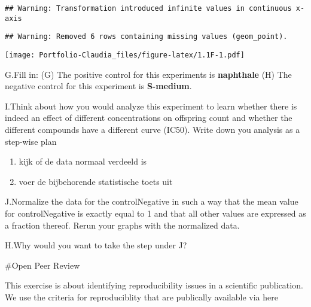 \documentclass[
]{book}
\providecommand{\tightlist}{%
  \setlength{\itemsep}{0pt}\setlength{\parskip}{0pt}}
\begin{document}
\begin{verbatim}
## Warning: Transformation introduced infinite values in continuous x-axis
\end{verbatim}

\begin{verbatim}
## Warning: Removed 6 rows containing missing values (geom_point).
\end{verbatim}

\texttt{[image: Portfolio-Claudia\_files/figure-latex/1.1F-1.pdf]}

G.Fill in: (G) The positive control for this experiments is \textbf{naphthale} (H) The negative control for this experiment is \textbf{S-medium}.

I.Think about how you would analyze this experiment to learn whether there is indeed an effect of different concentrations on offspring count and whether the different compounds have a different curve (IC50). Write down you analysis as a step-wise plan

\begin{enumerate}
\def\labelenumi{\arabic{enumi}.}
\tightlist
\item
  kijk of de data normaal verdeeld is
\item
  voer de bijbehorende statistische toets uit
\end{enumerate}

J.Normalize the data for the controlNegative in such a way that the mean value for controlNegative is exactly equal to 1 and that all other values are expressed as a fraction thereof. Rerun your graphs with the normalized data.

H.Why would you want to take the step under J?

\#Open Peer Review

This exercise is about identifying reproducibility issues in a scientific publication. We use the criteria for reproduciblity that are publically available via here
\end{document}
